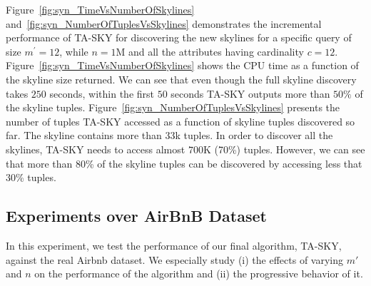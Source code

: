\vspace{1mm}
 Figure~\ref{fig:syn_TimeVsNumberOfSkylines} and~\ref{fig:syn_NumberOfTuplesVsSkylines} demonstrates the incremental performance of TA-SKY for discovering the new skylines for a specific query of size $m^\prime=12$, while $n=1$M and all the attributes having cardinality $c=12$. Figure~\ref{fig:syn_TimeVsNumberOfSkylines} shows the CPU time as a function of the skyline size returned. We can see that even though the full skyline discovery takes $250$ seconds, within the first $50$ seconds TA-SKY outputs more than $50\%$  of the skyline tuples. Figure~\ref{fig:syn_NumberOfTuplesVsSkylines} presents the number of tuples TA-SKY accessed as a function of skyline tuples discovered so far. The skyline contains more than $33$k tuples. In order to discover all the skylines, TA-SKY needs to access almost $700$K (70\%) tuples. However, we can see that more than $80$\% of the skyline tuples can be discovered by accessing less that $30$\% tuples.


\subsection{Experiments over AirBnB Dataset}\label{subsec:expAirbnb}
In this experiment, we test the performance of our final algorithm, TA-SKY, against the real Airbnb dataset. We especially study (i) the effects of varying $m'$ and $n$ on the performance of the algorithm and (ii) the progressive behavior of it.

